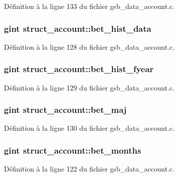 Définition à la ligne 133 du fichier gsb\_\-data\_\-account.c.

\subsubsection[{bet\_\-hist\_\-data}]{\setlength{\rightskip}{0pt plus 5cm}gint {\bf struct\_\-account::bet\_\-hist\_\-data}}\label{structstruct__account_a1bba17580fd9dd03b3f9934015f899a8}


Définition à la ligne 128 du fichier gsb\_\-data\_\-account.c.

\subsubsection[{bet\_\-hist\_\-fyear}]{\setlength{\rightskip}{0pt plus 5cm}gint {\bf struct\_\-account::bet\_\-hist\_\-fyear}}\label{structstruct__account_adb3e55e5c9e7cd366afba4f1d2a3da89}


Définition à la ligne 129 du fichier gsb\_\-data\_\-account.c.

\subsubsection[{bet\_\-maj}]{\setlength{\rightskip}{0pt plus 5cm}gint {\bf struct\_\-account::bet\_\-maj}}\label{structstruct__account_a23093a8bc3bb45ba46a6eda1f5488fe9}


Définition à la ligne 130 du fichier gsb\_\-data\_\-account.c.

\subsubsection[{bet\_\-months}]{\setlength{\rightskip}{0pt plus 5cm}gint {\bf struct\_\-account::bet\_\-months}}\label{structstruct__account_a23555715ae67c7d6281af4f7450673ba}


Définition à la ligne 122 du fichier gsb\_\-data\_\-account.c.

